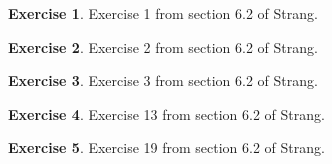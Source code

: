 \documentclass[11pt]{amsart}
\theoremstyle{definition}
\newtheorem{exercise}{Exercise}
\begin{document}
\begin{exercise}
Exercise 1 from section 6.2 of Strang.
\end{exercise}

\begin{exercise}
Exercise 2 from section 6.2 of Strang.
\end{exercise}

\begin{exercise}
Exercise 3 from section 6.2 of Strang.
\end{exercise}

\begin{exercise}
Exercise 13 from section 6.2 of Strang.
\end{exercise}

\begin{exercise}
Exercise 19 from section 6.2 of Strang.
\end{exercise}
\end{document}
